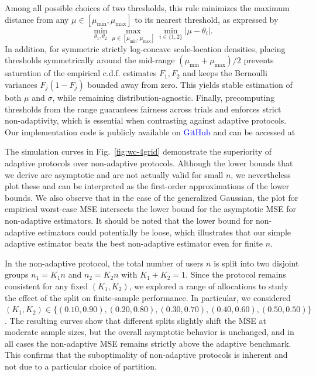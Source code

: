 \documentclass[10pt]{article} %
\theoremstyle{plain}
\theoremstyle{definition}
\theoremstyle{remark}
\begin{document}
Among all possible choices of two thresholds, this rule minimizes the maximum distance from any $\mu \in [\mu_{\min}, \mu_{\max}]$ to its nearest threshold, as expressed by
\[
\min_{\theta_1,\theta_2} \max_{\mu \in [\mu_{\min}, \mu_{\max}]} \min_{i \in \{1,2\}} |\mu - \theta_i|.
\]
In addition, for symmetric strictly log-concave scale-location densities, placing thresholds symmetrically around the mid-range \((\mu_{\min} + \mu_{\max})/2\) prevents saturation of the empirical c.d.f. estimates \(F_1, F_2\) and keeps the Bernoulli variances \(F_j(1 - F_j)\) bounded away from zero. This yields stable estimation of both \(\mu\) and \(\sigma\), while remaining distribution-agnostic. Finally, precomputing thresholds from the range guarantees fairness across trials and enforces strict non-adaptivity, which is essential when contrasting against adaptive protocols.  Our implementation code is publicly available on \textcolor{blue}{GitHub} and can be accessed at~\cite{github-code}


The simulation curves in Fig.~\ref{fig:wc-4grid} demonstrate the superiority of adaptive protocols over non-adaptive protocols. 
Although the lower bounds that we derive are asymptotic and are not actually valid for small $n$, we nevertheless plot these and can be interpreted as  the first-order approximations of the lower bounds. 
We also observe that in the case of the generalized Gaussian, the plot for empirical worst-case MSE intersects the lower bound for the asymptotic MSE for non-adaptive estimators. It should be noted that the lower bound for non-adaptive estimators could potentially be loose, which illustrates that our simple adaptive estimator beats the best non-adaptive estimator even for finite $n$. 


\par In the non-adaptive protocol, the total number of users $n$ is split into two disjoint groups $n_1 = K_1 n$ and $n_2 = K_2 n$ with $K_1+K_2=1$. 
Since the protocol remains consistent for any fixed $(K_1,K_2)$, we explored a range of allocations to study the effect of the split on finite-sample performance. 
In particular, we considered $(K_1,K_2) \in \{(0.10,0.90), (0.20,0.80), (0.30,0.70), (0.40,0.60), (0.50,0.50)\}$. 
The resulting curves show that different splits slightly shift the MSE at moderate sample sizes, but the overall asymptotic behavior is unchanged, and in all cases the non-adaptive MSE remains strictly above the adaptive benchmark. 
This confirms that the suboptimality of non-adaptive protocols is inherent and not due to a particular choice of partition.
\end{document}
